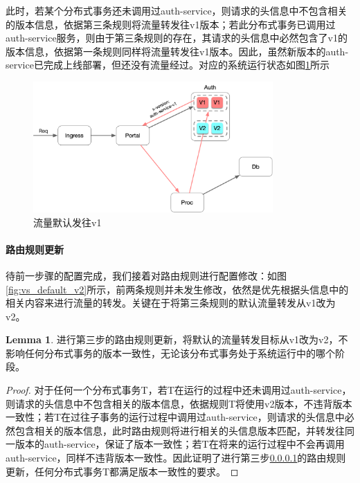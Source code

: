 \documentclass[a4paper, 12pt]{article}
\theoremstyle{definition}
\newtheorem{lemma}{Lemma}
\begin{document}
此时，若某个分布式事务还未调用过auth-service，则请求的头信息中不包含相关的版本信息，依据第三条规则将流量转发往v1版本；若此分布式事务已调用过auth-service服务，则由于第三条规则的存在，其请求的头信息中必然包含了v1的版本信息，依据第一条规则同样将流量转发往v1版本。因此，虽然新版本的auth-service已完成上线部署，但还没有流量经过。对应的系统运行状态如图\ref{fig:traffic_default_v1}所示
\begin{figure}[ht]
 \centering
 \includegraphics[height=5cm]{images/traffic_default_v1.png}
 \caption{流量默认发往v1}
 \label{fig:traffic_default_v1}
\end{figure}

\paragraph{路由规则更新}\label{section:update_route}
待前一步骤的配置完成，我们接着对路由规则进行配置修改：如图\ref{fig:vs_default_v2}所示，前两条规则并未发生修改，依然是优先根据头信息中的相关内容来进行流量的转发。关键在于将第三条规则的默认流量转发从v1改为v2。

\begin{lemma}
进行第三步的路由规则更新，将默认的流量转发目标从v1改为v2，不影响任何分布式事务的版本一致性，无论该分布式事务处于系统运行中的哪个阶段。
\end{lemma}

\begin{proof}
对于任何一个分布式事务T，若T在运行的过程中还未调用过auth-service，则请求的头信息中不包含相关的版本信息，依据规则T将使用v2版本，不违背版本一致性；若T在过往子事务的运行过程中调用过auth-service，则请求的头信息中必然包含相关的版本信息，此时路由规则将进行相关的头信息版本匹配，并转发往同一版本的auth-service，保证了版本一致性；若T在将来的运行过程中不会再调用auth-service，同样不违背版本一致性。因此证明了进行第三步\ref{section:update_route}的路由规则更新，任何分布式事务T都满足版本一致性的要求。
\end{proof}
\end{document}
